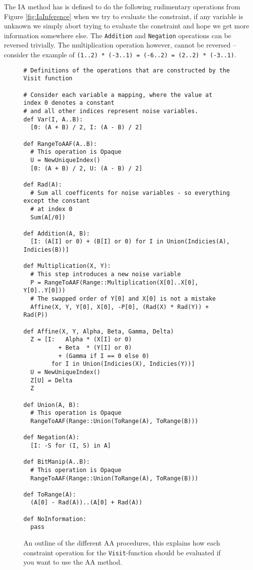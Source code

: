 The IA method has is defined to do the following rudimentary operations from Figure \ref{fig:IaInference} when we try to evaluate the constraint, if any variable is unknown we simply abort trying to evaluate the constraint and hope we get more information somewhere else. The \verb+Addition+ and \verb+Negation+ operations can be reversed trivially. The multiplication operation however, cannot be reversed -- consider the example of \verb!(1..2) * (-3..1) = (-6..2) = (2..2) * (-3..1)!.

\begin{figure}
\begin{verbatim}
# Definitions of the operations that are constructed by the Visit function

# Consider each variable a mapping, where the value at index 0 denotes a constant
# and all other indices represent noise variables.
def Var(I, A..B):
  [0: (A + B) / 2, I: (A - B) / 2]

def RangeToAAF(A..B):
  # This operation is Opaque
  U = NewUniqueIndex()
  [0: (A + B) / 2, U: (A - B) / 2]

def Rad(A):
  # Sum all coefficents for noise variables - so everything except the constant
  # at index 0
  Sum(A[/0])

def Addition(A, B):
  [I: (A[I] or 0) + (B[I] or 0) for I in Union(Indicies(A), Indicies(B))]

def Multiplication(X, Y):
  # This step introduces a new noise variable
  P = RangeToAAF(Range::Multiplication(X[0]..X[0], Y[0]..Y[0]))
  # The swapped order of Y[0] and X[0] is not a mistake
  Affine(X, Y, Y[0], X[0], -P[0], (Rad(X) * Rad(Y)) + Rad(P))

def Affine(X, Y, Alpha, Beta, Gamma, Delta)
  Z = [I:   Alpha * (X[I] or 0)
          + Beta  * (Y[I] or 0)
          + (Gamma if I == 0 else 0)
        for I in Union(Indicies(X), Indicies(Y))]
  U = NewUniqueIndex()
  Z[U] = Delta
  Z

def Union(A, B):
  # This operation is Opaque
  RangeToAAF(Range::Union(ToRange(A), ToRange(B)))
  
def Negation(A):
  [I: -S for (I, S) in A]

def BitManip(A..B):
  # This operation is Opaque
  RangeToAAF(Range::Union(ToRange(A), ToRange(B)))

def ToRange(A):
  (A[0] - Rad(A))..(A[0] + Rad(A))

def NoInformation:
  pass

\end{verbatim}
  \cprotect\caption{An outline of the different AA procedures, this explains how each constraint operation for the \verb+Visit+-function should be evaluated if you want to use the AA method.}
\label{fig:AaInference}
\end{figure}

